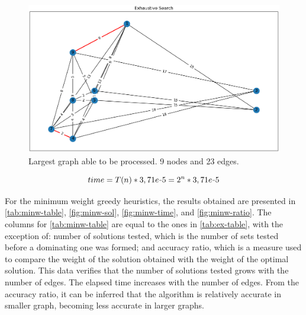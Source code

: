 \begin{figure}[!ht]
    \centering
    \includegraphics[width=1\linewidth]{figs/fig-9-0.5-exhaustive}
    \caption{Largest graph able to be processed. 9 nodes and 23 edges.}
    \label{fig:9-05-ex}
\end{figure}

\begin{equation}
    time = T(n) * 3,71e\scalebox{0.5}[1.0]{\( - \)}5 = 2^n * 3,71e\scalebox{0.5}[1.0]{\( - \)}5
    \label{eq:ex-time-calc}
\end{equation}

\newpage

For the minimum weight greedy heuristics, the results obtained are presented in \autoref{tab:minw-table}, \autoref{fig:minw-sol}, \autoref{fig:minw-time}, and \autoref{fig:minw-ratio}. 
The columns for \autoref{tab:minw-table} are equal to the ones in \autoref{tab:ex-table}, with the exception of: number of solutions tested, which is the number of sets tested before a dominating one was formed; and accuracy ratio, which is a measure used to compare the weight of the solution obtained with the weight of the optimal solution. 
This data verifies that the number of solutions tested grows with the number of edges.
The elapsed time increases with the number of edges.
From the accuracy ratio, it can be inferred that the algorithm is relatively accurate in smaller graph, becoming less accurate in larger graphs.



